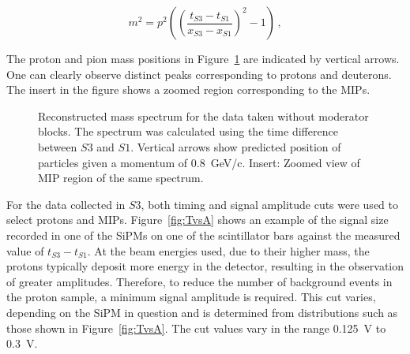 
\begin{equation} 
  m^2 = p^2 \left( 
  \left(\frac{t_{\mathit{S3}}-t_{\mathit{S1}}}{x_{\mathit{S3}}-x_{\mathit{S1}}} \right)^2 - 1  \right) \,,
  \label{eq:recoMass}
\end{equation}

The proton and pion mass positions in Figure~\ref{fig:s3tof_mass} are indicated by vertical arrows.
One can clearly observe distinct peaks corresponding to protons and deuterons. 
The insert in the figure shows a zoomed region corresponding to the MIPs. 

\begin{figure}[ht]
  \begin{adjustbox}{max totalsize={\linewidth}, center}
    
  \end{adjustbox}
  \caption{Reconstructed mass spectrum for the data taken without moderator blocks. The spectrum was calculated using the time difference between $\mathit{S3}$ and $\mathit{S1}$. Vertical arrows show predicted position of particles given a momentum of 0.8~GeV/c. Insert: Zoomed view of MIP region of the same spectrum.}
  \label{fig:s3tof_mass}
\end{figure}

For the data collected in $\mathit{S3}$, both timing and signal amplitude cuts were used to select protons and MIPs.
Figure~\ref{fig:TvsA} shows an example of the signal size recorded in one of the SiPMs on one of the scintillator bars against the measured value of $t_{\mathit{S3}} - t_{\mathit{S1}}$.
At the beam energies used, due to their higher mass, the protons typically deposit more energy in the detector, resulting in the observation of greater amplitudes.
Therefore, to reduce the number of background events in the proton sample, a minimum signal amplitude is required.
This cut varies, depending on the SiPM in question and is determined from distributions such as those shown in Figure~\ref{fig:TvsA}. 
The cut values vary in the range 0.125~V to 0.3~V.


